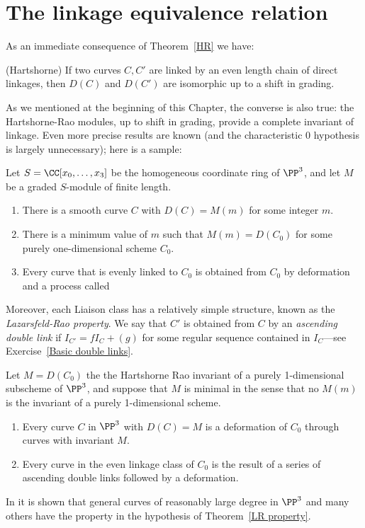 \section{The linkage equivalence relation}
As an immediate consequence of Theorem~\ref{HR} we have:
\begin{corollary}(Hartshorne)
 If two curves $C,C'$ are linked by an even length chain of direct linkages, then 
 $D(C)$ and $D(C')$ are isomorphic up to a shift in grading.
\end{corollary}

As we mentioned at the beginning of this Chapter, the converse is also true: the Hartshorne-Rao modules, up to shift in grading, provide a complete invariant of
linkage. Even more precise results are known (and the characteristic 0 hypothesis is largely unnecessary); here is a sample:

\begin{fact}
\begin{theorem}
Let $S = \CC[x_0, \dots, x_3]$ be the homogeneous coordinate ring of $\PP^3$, and let $M$ be a graded $S$-module of finite length.
\begin{enumerate}
\item There is a smooth curve $C$ with $D(C) = M(m)$ for some integer $m$.
\item There is a minimum value of $m$ such that $M(m) = D(C_0)$ for some purely one-dimensional scheme $C_0$.
\item Every curve that is evenly linked to $C_0$ is obtained from $C_0$ by deformation and a process called
\end{enumerate}
\end{theorem}

Moreover, each Liaison class has a relatively simple structure, known as the \emph{Lazarsfeld-Rao property}.
We say that $C'$ is obtained from $C$ by an \emph{ascending double link} if $I_{C'} = fI_C+(g)$ for some regular sequence
contained in $I_C$---see Exercise~\ref{Basic double links}. 

\begin{theorem}\cite{MR1087803}\label{LR property}
Let $M = D(C_0)$ the the Hartshorne Rao invariant of a purely 1-dimensional subscheme of $\PP^3$, and suppose that
$M$ is minimal in the sense that no $M(m)$ is the invariant of a purely 1-dimensional scheme. 
\begin{enumerate}
 \item Every curve $C$ in $\PP^3$ with $D(C) = M$ is a deformation of $C_0$ through curves with invariant $M$.
 \item Every curve in the even linkage class of $C_0$ is the result of a series of ascending double links followed by a deformation.
\end{enumerate}
\end{theorem}

In \cite{MR714753} it is shown that general curves of reasonably large degree in $\PP^3$ and many others have the property in the hypothesis
of  Theorem~\ref{LR property}.
\end{fact}


